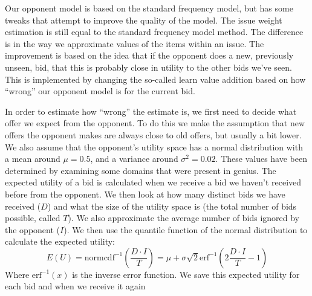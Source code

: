 Our opponent model is based on the standard frequency model, but has some tweaks that attempt to improve the quality of the model. The issue weight estimation is still equal to the standard frequency model method. The difference is in the way we approximate values of the items within an issue. The improvement is based on the idea that if the opponent does a new, previously unseen, bid, that this is probably close in utility to the other bids we've seen. This is implemented by changing the so-called learn value addition based on how ``wrong'' our opponent model is for the current bid. 

In order to estimate how ``wrong'' the estimate is, we first need to decide what offer we expect from the opponent. To do this we make the assumption that new offers the opponent makes are always close to old offers, but usually a bit lower. We also assume that the opponent's utility space has a normal distribution with a mean around $\mu = 0.5$, and a variance around $\sigma^2 = 0.02$. These values have been determined by examining some domains that were present in genius. The expected utility of a bid is calculated when we receive a bid we haven't received before from the opponent. We then look at how many distinct bids we have received ($D$) and what the size of the utility space is (the total number of bids possible, called $T$). We also approximate the average number of bids ignored by the opponent ($I$). We then use the quantile function of the normal distribution to calculate the expected utility:
\begin{equation}
  E(U) = \text{normcdf}^{-1} (\frac{D \cdot I}{T}) = \mu + \sigma \sqrt{2} \text{erf}^{-1} (2 \frac{D \cdot I}{T} - 1)
\end{equation}
Where $\text{erf}^{-1}(x)$ is the inverse error function. We save this expected utility for each bid and when we receive it again 